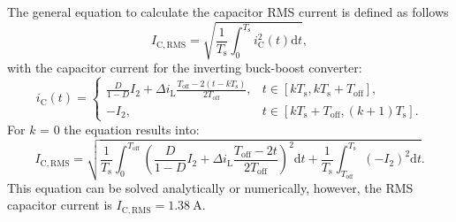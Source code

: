 
\begin{solutionblock}

    The general equation to calculate the capacitor RMS current is defined as follows
    \begin{equation}
        I_{\mathrm{C,RMS}} = \sqrt{\frac{1}{T_{\mathrm{s}}} \int_{0}^{T_{\mathrm{s}}}i_{\mathrm{C}}^2(t)\mathrm{d}t},
    \end{equation}
    with the capacitor current for the inverting buck-boost converter:
    \begin{equation}
        {i_\mathrm{C}(t) = \begin{cases}
            \frac{D}{1-D}I_2 + \Delta i_\mathrm{L} \frac{T_\mathrm{off}-2(t-kT_\mathrm{s})}{2T_\mathrm{off}}, & t\in [k T_\mathrm{s}, k T_\mathrm{s} + T_\mathrm{off}],\\
            -I_2, & t\in [k T_\mathrm{s}+ T_\mathrm{off}, (k+1) T_\mathrm{s}].
        \end{cases}}
    \end{equation}
    For $k$ = 0 the equation results into:
    \begin{equation}
        I_{\mathrm{C,RMS}} = \sqrt{\frac{1}{T_{\mathrm{s}}} \int_{0}^{T_{\mathrm{off}}} \left( \frac{D}{1-D}I_2 + \Delta i_\mathrm{L} \frac{T_\mathrm{off}-2t}{2T_\mathrm{off}}\right)^2 \mathrm{d}t+ \frac{1}{T_{\mathrm{s}}}\int_{T_{\mathrm{off}}}^{T_{\mathrm{s}}} \left(-I_2 \right)^2 \mathrm{d}t}.
    \end{equation}
    This equation can be solved analytically or numerically, however, the RMS capacitor current is $I_{\mathrm{C,RMS}} = \SI{1.38}{\ampere}$.
   
    
\end{solutionblock}



